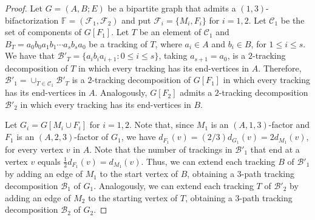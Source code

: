 \documentclass[12pt,reqno,a4paper]{amsart}
\newcommand{\D}{\mathcal{D}}
\newcommand{\B}{\mathcal{B}}
\begin{document}
\begin{proof}
	Let \(G = (A,B;E)\) be a bipartite graph that admits a 
	\((1,3)\)-bifactorization \(\mathbb{F}= (\mathcal{F}_1,\mathcal{F}_2)\) 
and put \(\mathcal{F}_i = \{M_i,F_i\}\) for \(i = 1,2\).
	Let \(\mathcal{C}_1\) be the set of components of \(G[F_1]\).
	Let \(T\) be an element of \(\mathcal{C}_1\)
	and \(B_T = a_0b_0a_1b_1\cdots a_sb_sa_0\) be a tracking of \(T\),
	where \(a_i \in A\) and \(b_i \in B\), for \(1\leq i\leq s\).
	We have that \(\B'_T = \{a_ib_ia_{i+1}\colon 0\leq i\leq s\}\), taking \(a_{s+1} = a_0\),
	is a \(2\)-tracking decomposition of \(T\)
	in which every tracking has its end-vertices in \(A\).
	Therefore, \(\B'_1 = \cup_{T \in \mathcal{C}_1}  \B'_T\)
	is a \(2\)-tracking decomposition of \(G[F_1]\)
	in which every tracking has its end-vertices in \(A\).
	Analogously, \(G[F_2]\) admits a \(2\)-tracking decomposition \(\B'_2\)
	in which every tracking has its end-vertices in \(B\).
	
	Let \(G_i = G[M_i\cup F_i]\) for \(i = 1,2\).
	Note that, since \(M_1\) is an \((A,1,3)\)-factor and \(F_1\) is an 
\((A,2,3)\)-factor
	of \(G_1\), we have \(d_{F_1}(v) = (2/3)d_{G_1}(v) = 2d_{M_1}(v)\),
	for every vertex \(v\) in \(A\).
	Note that the number of trackings in \(\B'_1\) that end at a vertex \(v\) 
	equals \(\frac{1}{2}d_{F_1}(v) = d_{M_1}(v)\).
%	
	Thus, we can extend each tracking \(B\) of \(\B'_1\) by adding 
	an edge of \(M_1\) to the start vertex of \(B\),
	obtaining a \(3\)-path tracking decomposition \(\B_1\) of \(G_1\).
	Analogously, we can extend each tracking \(T\) of \(\B'_2\) by adding
	an edge of \(M_2\) to the starting vertex of \(T\),
	obtaining a \(3\)-path tracking decomposition \(\B_2\) of \(G_2\).
	

\end{proof}
\end{document}
